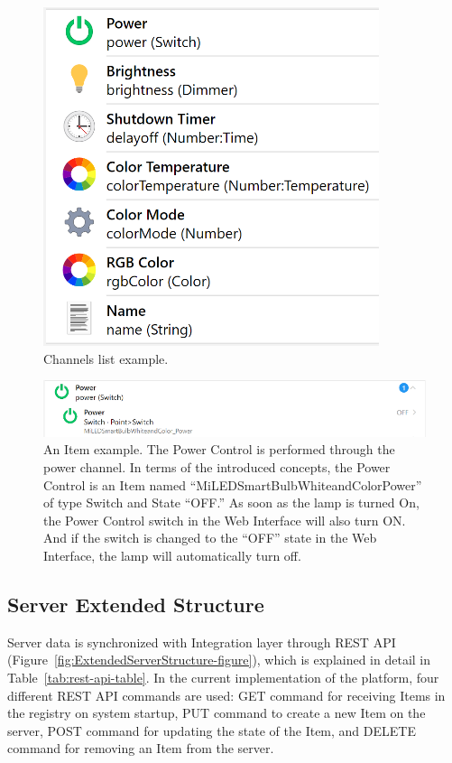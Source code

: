 \begin{figure}
  \centering
  \includegraphics[width=0.6\linewidth]{figures/XiaomiLampChannels.png}
  \caption{Channels list example.}
  \label{fig:XiaomiLampChannels-figure}
\end{figure}

\begin{figure}
  \centering
  \includegraphics[width=0.9\linewidth]{figures/XiaomiLampPowerItem.png}
  \caption{An Item example. The Power Control is performed through the power channel. In terms of the introduced concepts, the Power Control is an Item named ``MiLEDSmartBulbWhiteandColorPower'' of type Switch and State ``OFF.'' As soon as the lamp is turned On, the Power Control switch in the Web Interface will also turn ON. And if the switch is changed to the ``OFF'' state in the Web Interface, the lamp will automatically turn off.}
  \label{fig:XiaomiLampPowerItem-figure}
\end{figure}

\subsection{Server Extended Structure}

Server data is synchronized with Integration layer through REST API (Figure~\ref{fig:ExtendedServerStructure-figure}), which is explained in detail in Table~\ref{tab:rest-api-table}. In the current implementation of the platform, four different REST API commands are used: GET command for receiving Items in the registry on system startup, PUT command to create a new Item on the server, POST command for updating the state of the Item, and DELETE command for removing an Item from the server.

